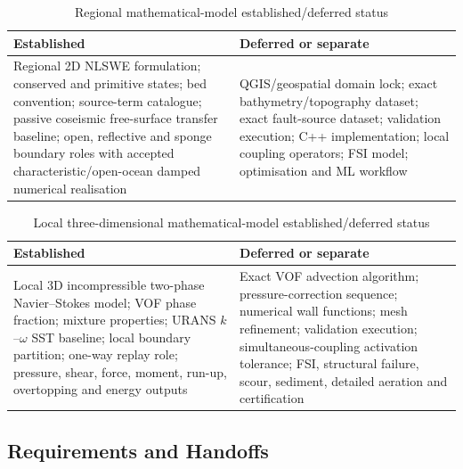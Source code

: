 \begin{table}[htbp]
  \centering
  \small
  \renewcommand{\arraystretch}{1.2}
  \begin{tabular}{
      p{}
      p{}
    }
    \hline
    Established
    &
    Deferred or separate
    \\
    \hline
    Regional 2D NLSWE formulation; conserved and primitive states; bed
    convention; source-term catalogue; passive coseismic free-surface
    transfer baseline; open, reflective and sponge boundary roles with
    accepted characteristic/open-ocean damped numerical realisation
    &
    QGIS/geospatial domain lock; exact bathymetry/topography dataset;
    exact fault-source dataset; validation execution; C++
    implementation; local coupling operators; FSI model; optimisation
    and ML workflow
    \\
    \hline
  \end{tabular}
  \caption{Regional mathematical-model established/deferred status}
  \label{tab:res-mod-spec-regional-established-deferred}
\end{table}

\begin{table}[htbp]
  \centering
  \small
  \renewcommand{\arraystretch}{1.2}
  \begin{tabular}{
      p{}
      p{}
    }
    \hline
    Established
    &
    Deferred or separate
    \\
    \hline
    Local 3D incompressible two-phase Navier--Stokes model; VOF phase
    fraction; mixture properties; URANS $k$--$\omega$ SST baseline;
    local boundary partition; one-way replay role; pressure, shear,
    force, moment, run-up, overtopping and energy outputs
    &
    Exact VOF advection algorithm; pressure-correction sequence;
    numerical wall functions; mesh refinement; validation execution;
    simultaneous-coupling activation tolerance; FSI, structural
    failure, scour, sediment, detailed aeration and certification
    \\
    \hline
  \end{tabular}
  \caption{Local three-dimensional mathematical-model established/deferred status}
  \label{tab:res-mod-spec-local-established-deferred}
\end{table}

\subsection{Requirements and Handoffs}
\label{sec:res-mod-spec-requirements}

